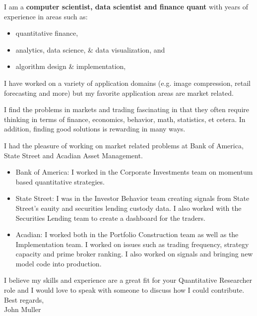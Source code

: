 \documentclass{letter}
\begin{document}
\noindent
I am a \textbf {computer scientist, data scientist and finance quant} with years of experience 
in areas such as:
\vspace{-.1in}
\begin{itemize}[noitemsep]
 \item quantitative finance, 
 \item analytics, data science, \& data visualization, and
 \item algorithm design \& implementation,
\end{itemize}

\noindent I have worked on a variety of application domains 
(e.g. image compression, retail forecasting and more)
but my favorite application areas are market related.

\noindent I find the problems in markets and trading fascinating in that they often require thinking in terms of finance, economics, behavior, math, statistics, et cetera.
In addition, finding good solutions is rewarding in many ways.


\noindent
I had the pleasure of working on market related 
problems at Bank of America, State Street and Acadian Asset Management.
\begin{itemize}
\item Bank of America: I worked in the Corporate Investments team on momentum based quantitative strategies.

\item State Street: I was in the Investor Behavior team 
 creating signals from State Street's eauity and securities lending custody data.
 I also worked with the Securities Lending team to create a dashboard for the traders.
 
\item Acadian: I worked both in the Portfolio Construction team as well as the Implementation team. I worked on issues such as trading frequency, strategy capacity and prime broker ranking. I also worked on signals and bringing new model code into production.
 \end{itemize}
 

\noindent
I believe my skills and experience are a great fit for your Quantitative Researcher role and 
I would love to speak with someone to discuss how I could contribute.\\

\noindent Best regards,\\
John Muller
\end{document}
